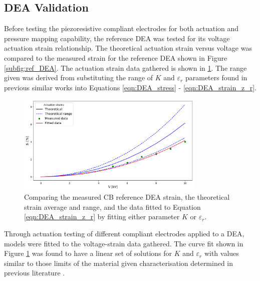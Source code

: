 	\subsection{DEA Validation}
	\label{subsec:dea_validation2}
	Before testing the piezoresistive compliant electrodes for both actuation and pressure mapping capability, the reference DEA was tested for its voltage actuation strain relationship. The theoretical actuation strain versus voltage was compared to the measured strain for the reference DEA shown in Figure \ref{subfig:ref_DEA}. The actuation strain data gathered is shown in \ref{fig:ref_DEA_results}. The range given was derived from substituting the range of $K$ and $\varepsilon_r$ parameters found in previous similar works\cite{Liu2018, Helal2018, Huang2023} into Equations \ref{eqn:DEA_stress} - \ref{eqn:DEA_strain_z_r}.
	\begin{figure}[H]
		\centering
		\includegraphics[width = 0.8\textwidth]{Figures/CB_vs_theory_range_vs_fitv2.png} %
        \vspace{0.2cm}
		\caption{Comparing the measured CB reference DEA strain, the theoretical strain average and range, and the data fitted to Equation \ref{eqn:DEA_strain_z_r} by fitting either parameter $K$ or $\varepsilon_r$.}
		\label{fig:ref_DEA_results}
	\end{figure}
	Through actuation testing of different compliant electrodes applied to a DEA, models were fitted to the voltage-strain data gathered. The curve fit shown in Figure \ref{fig:ref_DEA_results} was found to have a linear set of solutions for $K$ and $\varepsilon_r$ with values similar to those limits of the material given characterisation determined in previous literature \cite{Carpi2003} .
	

